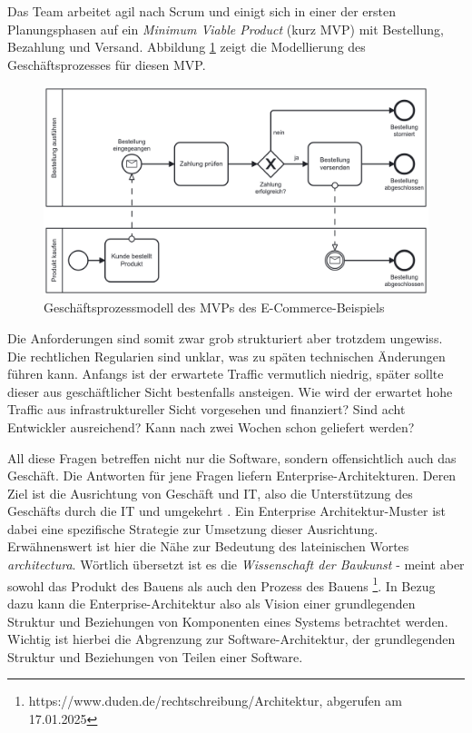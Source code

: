 \documentclass[acmtog]{acmart}
\begin{document}
Das Team arbeitet agil nach Scrum und einigt sich in einer der ersten Planungsphasen auf ein \textit{Minimum Viable Product} (kurz MVP) mit Bestellung, Bezahlung und Versand.
Abbildung \ref{fig:ecommerce-bpm} zeigt die Modellierung des Geschäftsprozesses für diesen MVP\@.
\begin{figure}[!h]
  \centering
  \includegraphics[width=\linewidth]{images/einleitung/ecommerce-order}
  \caption{Geschäftsprozessmodell des MVPs des E-Commerce-Beispiels}
  \label{fig:ecommerce-bpm}
\end{figure}
Die Anforderungen sind somit zwar grob strukturiert aber trotzdem ungewiss.
Die rechtlichen Regularien sind unklar, was zu späten technischen Änderungen führen kann.
Anfangs ist der erwartete Traffic vermutlich niedrig, später sollte dieser aus geschäftlicher Sicht bestenfalls ansteigen.
Wie wird der erwartet hohe Traffic aus infrastruktureller Sicht vorgesehen und finanziert?
Sind acht Entwickler ausreichend?
Kann nach zwei Wochen schon geliefert werden?

All diese Fragen betreffen nicht nur die Software, sondern offensichtlich auch das Geschäft.
Die Antworten für jene Fragen liefern Enterprise-Architekturen.
Deren Ziel ist die Ausrichtung von Geschäft und IT, also die Unterstützung des Geschäfts durch die IT und umgekehrt \cite{eaprinciples}.
Ein Enterprise Architektur-Muster ist dabei eine spezifische Strategie zur Umsetzung dieser Ausrichtung.
Erwähnenswert ist hier die Nähe zur Bedeutung des lateinischen Wortes \textit{architectura}.
Wörtlich übersetzt ist es die \textit{Wissenschaft der Baukunst} - meint aber sowohl das Produkt des Bauens als auch den Prozess des Bauens \footnote{https://www.duden.de/rechtschreibung/Architektur, abgerufen am 17.01.2025}.
In Bezug dazu kann die Enterprise-Architektur also als Vision einer grundlegenden Struktur und Beziehungen von Komponenten eines Systems betrachtet werden.
Wichtig ist hierbei die Abgrenzung zur Software-Architektur, der grundlegenden Struktur und Beziehungen von Teilen einer Software.
\end{document}
